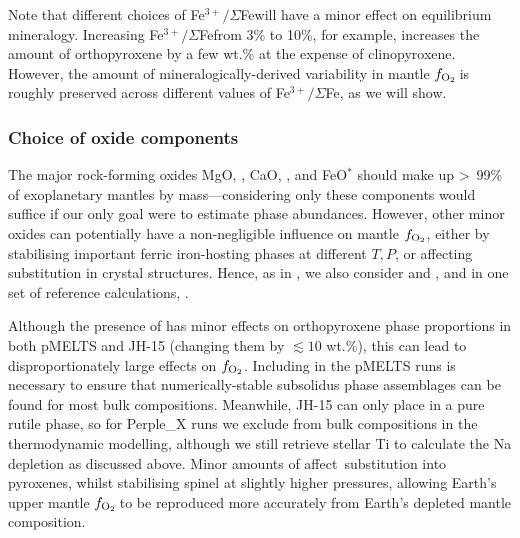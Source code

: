 \documentclass[fleqn,usenatbib,twocolumn]{mnras}
\newcommand{\fo}{$f_{\ce{O2}}$}
\newcommand{\ferric}{\ce{Fe^{3+}}}
\newcommand{\xfer}{Fe$^{3+}/\Sigma$Fe}
\newcommand{\todo}[1]{\textit{\textcolor{violet}{{#1}}}}
\begin{document}
Note that different choices of \xfer\;will have a minor effect on equilibrium mineralogy. Increasing \xfer\;from 3\% to 10\%, for example, increases the amount of orthopyroxene by a few wt.\% at the expense of clinopyroxene. %
However, the amount of mineralogically-derived variability in mantle \fo\,is roughly preserved across different values of \xfer, as we will show.


\subsubsection{Choice of oxide components}\label{sec:methods-components}

The major rock-forming oxides MgO, , CaO, , and FeO$^*$ should make up \textgreater~99\% of exoplanetary mantles by mass---considering only these components would suffice if our only goal were to estimate phase abundances. However, other minor oxides can potentially have a non-negligible influence on mantle \fo, either by stabilising important ferric iron-hosting phases at different $T,P$, or affecting \ferric\,substitution in crystal structures. Hence, as in \citet{stolper_effects_2020}, we also consider  and , and in one set of reference calculations, . 

Although the presence of  has minor effects on orthopyroxene phase proportions in both pMELTS and JH-15 (changing them by $\lesssim10$ wt.\%), this can lead to disproportionately large effects on \fo. Including  in the pMELTS runs is necessary to ensure that numerically-stable subsolidus phase assemblages can be found for most bulk compositions. Meanwhile, JH-15 can only place  in a pure rutile phase, so for Perple\_X runs we exclude  from bulk compositions in the thermodynamic modelling, although we still retrieve stellar Ti to calculate the Na depletion as discussed above. Minor amounts of  affect \ferric\,substitution into pyroxenes, whilst stabilising spinel at slightly higher pressures, allowing Earth's upper mantle \fo\,to be reproduced more accurately from Earth's depleted mantle composition.



\end{document}
